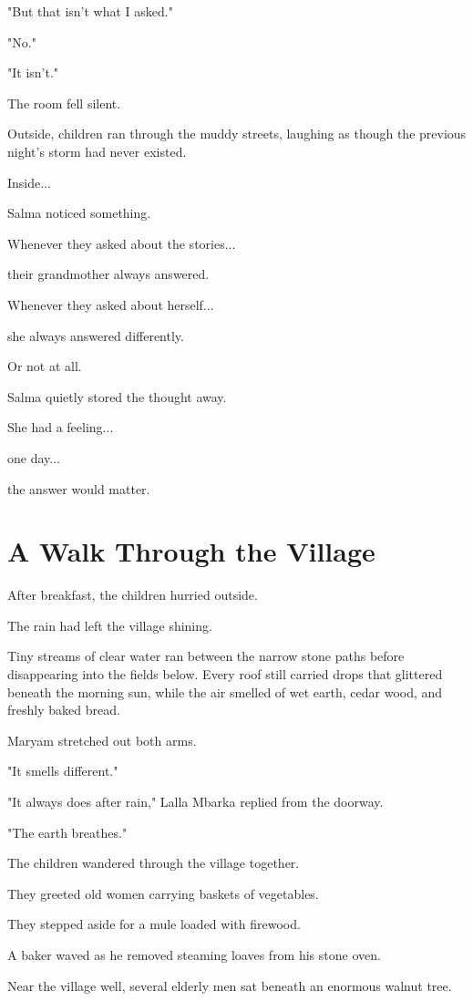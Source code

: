 \documentclass[12pt,openany]{book}
\begin{document}
"But that isn't what I asked."

"No."

"It isn't."

The room fell silent.

Outside, children ran through the muddy streets, laughing as though the previous night's storm had never existed.

Inside...

Salma noticed something.

Whenever they asked about the stories...

their grandmother always answered.

Whenever they asked about herself...

she always answered differently.

Or not at all.

Salma quietly stored the thought away.

She had a feeling...

one day...

the answer would matter.
\section*{A Walk Through the Village}

After breakfast, the children hurried outside.

The rain had left the village shining.

Tiny streams of clear water ran between the narrow stone paths before disappearing into the fields below. Every roof still carried drops that glittered beneath the morning sun, while the air smelled of wet earth, cedar wood, and freshly baked bread.

Maryam stretched out both arms.

"It smells different."

"It always does after rain," Lalla Mbarka replied from the doorway.

"The earth breathes."

The children wandered through the village together.

They greeted old women carrying baskets of vegetables.

They stepped aside for a mule loaded with firewood.

A baker waved as he removed steaming loaves from his stone oven.

Near the village well, several elderly men sat beneath an enormous walnut tree.
\end{document}
